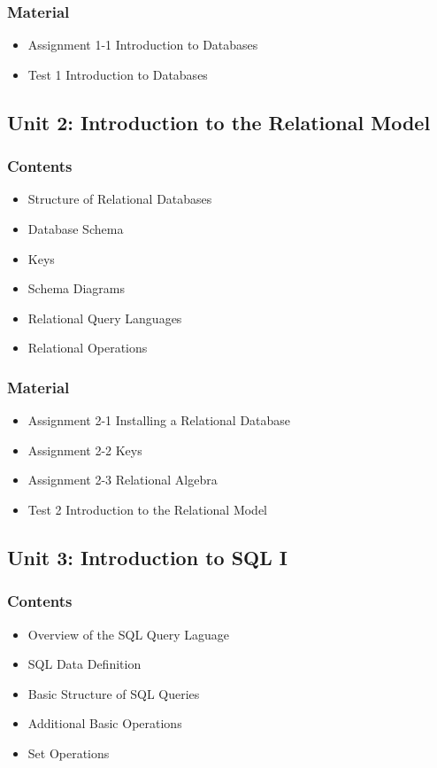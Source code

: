 \documentclass[catalan, a4paper, 12pt, titlepage]{article}
\begin{document}
  \subsubsection{Material}

  \begin{itemize}
	  \item Assignment 1-1 Introduction to Databases 
	  \item Test 1 Introduction to Databases
  \end{itemize}

  \subsection{Unit 2: Introduction to the Relational Model}

  \subsubsection{Contents}

  \begin{itemize}
	  \item Structure of Relational Databases
	  \item Database Schema
	  \item Keys
	  \item Schema Diagrams
	  \item Relational Query Languages
	  \item Relational Operations
  \end{itemize}

  \subsubsection{Material}

  \begin{itemize}
	  \item Assignment 2-1 Installing a Relational Database
	  \item Assignment 2-2 Keys
	  \item Assignment 2-3 Relational Algebra
	  \item Test 2 Introduction to the Relational Model
  \end{itemize}

  \subsection{Unit 3: Introduction to SQL I}

  \subsubsection{Contents}
  \begin{itemize}
	  \item Overview of the SQL Query Laguage
	  \item SQL Data Definition
	  \item Basic Structure of SQL Queries
	  \item Additional Basic Operations
	  \item Set Operations
  \end{itemize}
\end{document}
